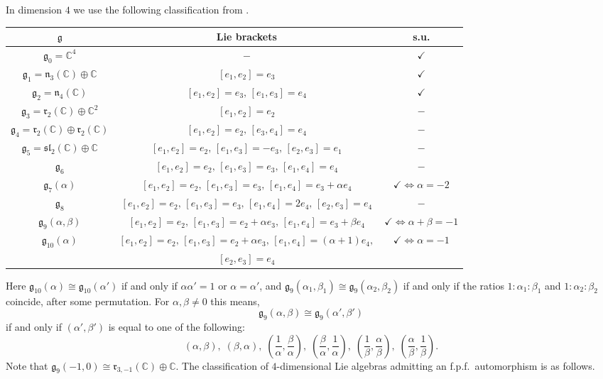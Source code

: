 \documentclass[12pt]{amsart}
\theoremstyle{definition}
\theoremstyle{remark}
\newcommand{\C}{\mathbb{C}}
\newcommand{\Lg}{\mathfrak{g}}
\newcommand{\Ll}{\mathfrak{l}}
\newcommand{\Ln}{\mathfrak{n}}
\newcommand{\Lr}{\mathfrak{r}}
\newcommand{\Ls}{\mathfrak{s}}
\newcommand{\al}{\alpha}
\newcommand{\be}{\beta}
\newcommand{\ck}{\checkmark}
\begin{document}
In dimension $4$ we use the following classification from \cite{AGA}.
\vspace*{0.5cm}
\begin{center}
\begin{tabular}{c|c|c}
$\Lg$ & Lie brackets & s.u.\\
\hline
$\Lg_0=\C^4$ &  $-$  & $\ck$ \\
$\Lg_1=\Ln_3(\C)\oplus \C$ & $[e_1,e_2]=e_3$ & $\ck$ \\
$\Lg_2=\Ln_4(\C)$ & $[e_1,e_2]=e_3,\, [e_1,e_3]=e_4$ & $\ck$ \\
$\Lg_3=\Lr_2(\C) \oplus  \C^2$ & $[e_1,e_2]=e_2$ & $-$ \\
$\Lg_4=\Lr_2(\C) \oplus \Lr_2(\C)$ & $[e_1,e_2]=e_2, \,[e_3,e_4]=e_4$ & $-$ \\
$\Lg_5=\Ls\Ll_2(\C) \oplus \C$ & $[e_1,e_2]=e_2, \,[e_1,e_3]=-e_3,\,[e_2,e_3]=e_1$ & $-$ \\
$\Lg_6$ & $[e_1,e_2]=e_2, \,[e_1,e_3]=e_3,\,[e_1,e_4]=e_4$ & $-$ \\
$\Lg_7(\al)$ & $[e_1,e_2]=e_2, \,[e_1,e_3]=e_3,\,[e_1,e_4]=e_3+\al e_4$ & $\ck \Leftrightarrow \al=-2$\\
$\Lg_8$ & $[e_1,e_2]=e_2, \,[e_1,e_3]=e_3,\,[e_1,e_4]=2e_4,\,[e_2,e_3]=e_4$ & $-$ \\
$\Lg_9(\al,\be)$ & $[e_1,e_2]=e_2, \,[e_1,e_3]=e_2+\al e_3,\,[e_1,e_4]=e_3+\be e_4$ & $\ck \Leftrightarrow \al+\be=-1$\\
$\Lg_{10}(\al)$ & $[e_1,e_2]=e_2, \,[e_1,e_3]=e_2+\al e_3,\,[e_1,e_4]=(\al +1)e_4,$ & $\ck \Leftrightarrow \al=-1$\\
               & $[e_2,e_3]=e_4$ & \\
\end{tabular}
\end{center}
\vspace*{0.5cm}
Here $\Lg_{10}(\al)\cong \Lg_{10}(\al')$ if and only if $\al\al'=1$ or $\al=\al'$,
and $\Lg_9(\al_1,\be_1)\cong \Lg_9(\al_2,\be_2)$ if and only if the ratios
$1:\al_1:\be_1$ and $1:\al_2:\be_2$ coincide, after some permutation.
For $\al,\be\neq 0$ this means,
\[
\Lg_9(\al,\be) \cong \Lg_9(\al',\be')
\]
if and only if $(\al',\be')$ is equal to one of the following:
\[
(\al,\be),\; (\be,\al),\; 
\left( \frac{1}{\al}, \frac{\be}{\al} \right),\;
\left( \frac{\be}{\al}, \frac{1}{\al} \right),\; 
\left( \frac{1}{\be}, \frac{\al}{\be} \right),\;
\left( \frac{\al}{\be}, \frac{1}{\be} \right).
\]
Note that $\Lg_9(-1,0)\cong \Lr_{3,-1}(\C)\oplus \C$. 
The classification of $4$-dimensional Lie algebras admitting an f.p.f.\ automorphism is as follows.
\end{document}
